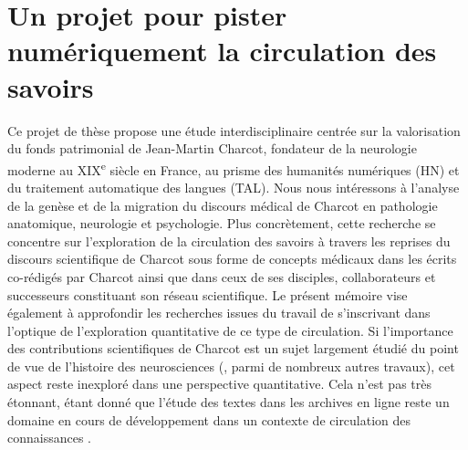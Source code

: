 \section{Un projet pour pister numériquement la circulation des savoirs}
Ce projet de thèse propose une étude interdisciplinaire centrée sur la valorisation du fonds patrimonial de Jean-Martin Charcot, fondateur de la neurologie moderne au XIX\textsuperscript{e} siècle en France, au prisme des humanités numériques (\textsc{HN}) et du traitement automatique des langues (\textsc{TAL}). Nous nous intéressons à l'analyse de la genèse et de la migration du discours médical de Charcot en pathologie anatomique, neurologie et psychologie. Plus concrètement, cette recherche se concentre sur l'exploration de la circulation des savoirs à travers les reprises du discours scientifique de Charcot sous forme de concepts médicaux dans les écrits co-rédigés par Charcot ainsi que dans ceux de ses disciples, collaborateurs et successeurs constituant son \og{}réseau scientifique\fg{}. Le présent mémoire vise également à approfondir les recherches issues du travail de \citet{petkovic2023circulation} s'inscrivant dans l'optique de l'exploration quantitative de ce type de circulation. 
 Si l'importance des contributions scientifiques de Charcot est un sujet largement étudié du point de vue de l'histoire des neurosciences (\citealp{bogousslavsky2011following,broussolle2012,camargo2024}, parmi de nombreux autres travaux), cet aspect reste inexploré dans une perspective quantitative. Cela n'est pas très étonnant, étant donné que l'étude des textes dans les archives en ligne reste un domaine en cours de développement dans un contexte de circulation des connaissances \citep[p.~4]{milia2023}.
